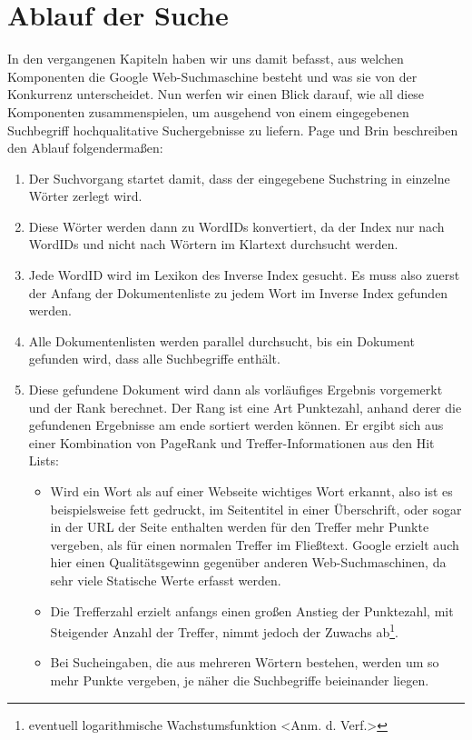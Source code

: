 \documentclass[12pt, a4paper]{llncs}
\begin{document}
	\section{Ablauf der Suche}
	In den vergangenen Kapiteln haben wir uns damit befasst, aus welchen Komponenten die Google Web-Suchmaschine besteht und was sie von der Konkurrenz unterscheidet.
	Nun werfen wir einen Blick darauf, wie all diese Komponenten zusammenspielen, um ausgehend von einem eingegebenen Suchbegriff hochqualitative Suchergebnisse zu
	liefern. Page und Brin beschreiben den Ablauf folgendermaßen:
	\begin{enumerate}
	\item Der Suchvorgang startet damit, dass der eingegebene Suchstring in einzelne Wörter zerlegt wird.
	\item Diese Wörter werden dann zu WordIDs konvertiert, da der Index nur nach WordIDs und nicht nach Wörtern im Klartext durchsucht werden.
	\item Jede WordID wird im Lexikon des Inverse Index gesucht. Es muss also zuerst der Anfang der Dokumentenliste zu jedem Wort im Inverse Index gefunden werden.
	\item Alle Dokumentenlisten werden parallel durchsucht, bis ein Dokument gefunden wird, dass alle Suchbegriffe enthält.
	\item Diese gefundene Dokument wird dann als vorläufiges Ergebnis vorgemerkt und der Rank berechnet. Der Rang ist eine Art Punktezahl, anhand derer
		die gefundenen Ergebnisse am ende sortiert werden können. Er ergibt sich aus einer Kombination von PageRank und Treffer-Informationen aus den Hit Lists:
	\begin{itemize}
		\item Wird ein Wort als auf einer Webseite wichtiges Wort erkannt, also ist es beispielsweise fett gedruckt, im Seitentitel in einer Überschrift, oder
			sogar in der URL der Seite enthalten werden für den Treffer mehr Punkte vergeben, als für einen normalen Treffer im Fließtext. Google erzielt auch hier
			einen Qualitätsgewinn gegenüber anderen Web-Suchmaschinen, da sehr viele Statische Werte erfasst werden.
		\item Die Trefferzahl erzielt anfangs einen großen Anstieg der Punktezahl, mit Steigender Anzahl der Treffer, nimmt jedoch der Zuwachs ab\footnote{eventuell
			logarithmische Wachstumsfunktion \textless Anm. d. Verf.\textgreater}.
		\item Bei Sucheingaben, die aus mehreren Wörtern bestehen, werden um so mehr Punkte vergeben, je näher die Suchbegriffe beieinander liegen.

\end{itemize}
\end{enumerate}
\end{document}
